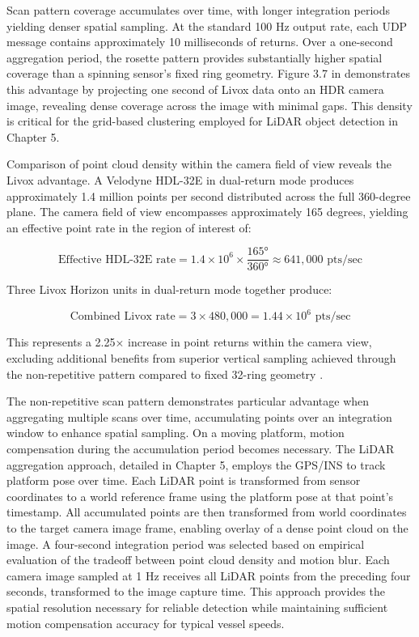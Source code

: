 \documentclass{erauthesis}
\begin{document}
Scan pattern coverage accumulates over time, with longer integration periods yielding denser spatial sampling.
At the standard 100 Hz output rate, each UDP message contains approximately 10 milliseconds of returns.
Over a one-second aggregation period, the rosette pattern provides substantially higher spatial coverage than a spinning sensor's fixed ring geometry.
Figure 3.7 in \cite{thompson2023} demonstrates this advantage by projecting one second of Livox data onto an \ac{HDR} camera image, revealing dense coverage across the image with minimal gaps.
This density is critical for the grid-based clustering employed for \ac{LiDAR} object detection in Chapter 5.

Comparison of point cloud density within the camera field of view reveals the Livox advantage.
A Velodyne HDL-32E in dual-return mode produces approximately 1.4 million points per second distributed across the full 360-degree plane.
The camera field of view encompasses approximately 165 degrees, yielding an effective point rate in the region of interest of:

$$\text{Effective HDL-32E rate} = 1.4 \times 10^6 \times \frac{165°}{360°} \approx 641,000 \text{ pts/sec}$$

Three Livox Horizon units in dual-return mode together produce:

$$\text{Combined Livox rate} = 3 \times 480,000 = 1.44 \times 10^6 \text{ pts/sec}$$

This represents a 2.25× increase in point returns within the camera view, excluding additional benefits from superior vertical sampling achieved through the non-repetitive pattern compared to fixed 32-ring geometry \cite{thompson2023}.

The non-repetitive scan pattern demonstrates particular advantage when aggregating multiple scans over time, accumulating points over an integration window to enhance spatial sampling.
On a moving platform, motion compensation during the accumulation period becomes necessary.
The \ac{LiDAR} aggregation approach, detailed in Chapter 5, employs the \ac{GPS}/\ac{INS} to track platform pose over time.
Each \ac{LiDAR} point is transformed from sensor coordinates to a world reference frame using the platform pose at that point's timestamp.
All accumulated points are then transformed from world coordinates to the target camera image frame, enabling overlay of a dense point cloud on the image.
A four-second integration period was selected based on empirical evaluation of the tradeoff between point cloud density and motion blur.
Each camera image sampled at 1 Hz receives all \ac{LiDAR} points from the preceding four seconds, transformed to the image capture time.
This approach provides the spatial resolution necessary for reliable detection while maintaining sufficient motion compensation accuracy for typical vessel speeds.
\end{document}

